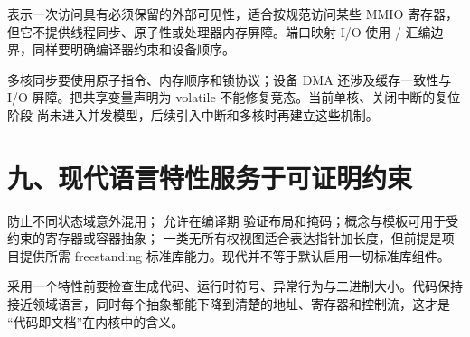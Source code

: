  表示一次访问具有必须保留的外部可见性，适合按规范访问某些
MMIO 寄存器，但它不提供线程同步、原子性或处理器内存屏障。端口映射 I/O 使用
/ 汇编边界，同样要明确编译器约束和设备顺序。

多核同步要使用原子指令、内存顺序和锁协议；设备 DMA 还涉及缓存一致性与 I/O
屏障。把共享变量声明为 volatile 不能修复竞态。当前单核、关闭中断的复位阶段
尚未进入并发模型，后续引入中断和多核时再建立这些机制。

\section{九、现代语言特性服务于可证明约束}

 防止不同状态域意外混用； 允许在编译期
验证布局和掩码；概念与模板可用于受约束的寄存器或容器抽象；
 一类无所有权视图适合表达指针加长度，但前提是项目提供所需
freestanding 标准库能力。现代并不等于默认启用一切标准库组件。

采用一个特性前要检查生成代码、运行时符号、异常行为与二进制大小。代码保持
接近领域语言，同时每个抽象都能下降到清楚的地址、寄存器和控制流，这才是
“代码即文档”在内核中的含义。
